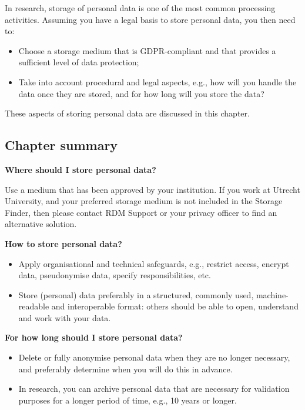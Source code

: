 \documentclass[
]{book}
\providecommand{\tightlist}{%
  \setlength{\itemsep}{0pt}\setlength{\parskip}{0pt}}
\begin{document}
In research, storage of personal data is one of the most common processing
activities. Assuming you have a legal basis to store personal data, you
then need to:

\begin{itemize}
\tightlist
\item
  Choose a storage medium that is GDPR-compliant and that provides a sufficient
  level of data protection;
\item
  Take into account procedural and legal aspects, e.g., how will you handle the
  data once they are stored, and for how long will you store the data?
\end{itemize}

These aspects of storing personal data are discussed in this chapter.

\hypertarget{chapter-summary-1}{%
\subsection{Chapter summary}\label{chapter-summary-1}}

\textbf{Where should I store personal data?}

Use a medium that has been approved by your institution. If you work at Utrecht
University, and your preferred storage medium is not included in the
Storage Finder,
then please contact
RDM Support
or your privacy officer
to find an alternative solution.

\textbf{How to store personal data?}

\begin{itemize}
\tightlist
\item
  Apply organisational and technical safeguards,
  e.g., restrict access, encrypt data, pseudonymise data, specify responsibilities, etc.
\item
  Store (personal) data preferably in a structured, commonly used, machine-readable
  and interoperable format: others should be able to open, understand and work
  with your data.
\end{itemize}

\textbf{For how long should I store personal data?}

\begin{itemize}
\tightlist
\item
  Delete or fully anonymise personal data when they are no longer necessary,
  and preferably determine when you will do this in advance.
\item
  In research, you can archive personal data that are necessary for validation
  purposes for a longer period of time, e.g., 10 years or longer.
\end{itemize}
\end{document}

